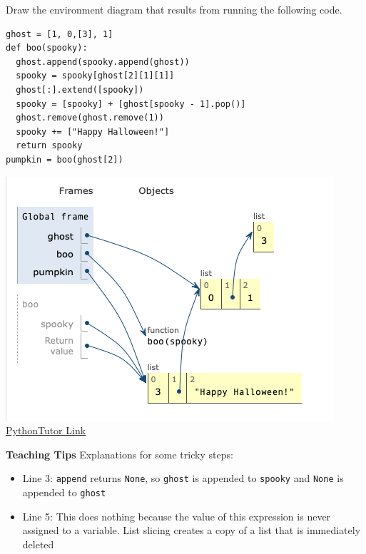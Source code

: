\begin{blocksection}
\question Draw the environment diagram that results from running the following code.
\begin{lstlisting}
ghost = [1, 0,[3], 1]
def boo(spooky):
  ghost.append(spooky.append(ghost))
  spooky = spooky[ghost[2][1][1]]
  ghost[:].extend([spooky])
  spooky = [spooky] + [ghost[spooky - 1].pop()] 
  ghost.remove(ghost.remove(1))
  spooky += ["Happy Halloween!"]
  return spooky
pumpkin = boo(ghost[2])
\end{lstlisting}

\begin{solution}[1in]
  \includegraphics[width=.5\textwidth]{spooky-list_sol.png}
  \newline
  \href{http://pythontutor.com/visualize.html#code=ghost%20%3D%20%5B1,%200,%5B3%5D,%201%5D%0Adef%20boo%28spooky%29%3A%0A%20%20%20%20%20%20%20%20ghost.append%28spooky.append%28ghost%29%29%0A%20%20%20%20%20%20%20%20spooky%20%3D%20spooky%5Bghost%5B2%5D%5B1%5D%5B1%5D%5D%0A%20%20%20%20%20%20%20%20ghost%5B%3A%5D.extend%28%5Bspooky%5D%29%0A%20%20%20%20%20%20%20%20spooky%20%3D%20%5Bspooky%5D%20%2B%20%5Bghost%5Bspooky%20-%201%5D.pop%28%29%5D%20%0A%20%20%20%20%20%20%20%20ghost.remove%28ghost.remove%281%29%29%0A%20%20%20%20%20%20%20%20spooky%20%2B%3D%20%5B%22Happy%20Halloween!%22%5D%0A%20%20%20%20%20%20%20%20return%20spooky%0A%20%20%20%20%20%20%20%20%0Apumpkin%20%3D%20boo%28ghost%5B2%5D%29&cumulative=false&heapPrimitives=nevernest&mode=edit&origin=opt-frontend.js&py=3&rawInputLstJSON=%5B%5D&textReferences=false}{PythonTutor Link} 
\end{solution}
\begin{guide}
\textbf{Teaching Tips}
\newline
  Explanations for some tricky steps:
  \begin{itemize}
    \item Line 3: \lstinline{append} returns \lstinline{None}, so \lstinline{ghost} is appended to \lstinline{spooky} and \lstinline{None} is appended to \lstinline{ghost}
    \item Line 5: This does nothing because the value of this expression is never assigned to a variable. List slicing creates a copy of a list that is immediately deleted

\end{itemize}
\end{guide}
\end{blocksection}
